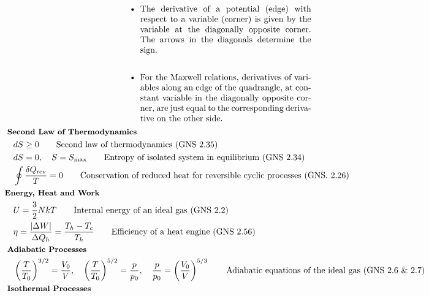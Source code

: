 \documentclass[10pt]{article}
\newcommand{\lrp}[1]{\left( #1 \right)}
\newlength{\du}
\begin{document}
\begin{multicols}{2}
\begin{align*}
		&\begin{minipage}{0.3 \columnwidth}
			
		\end{minipage}
		\begin{minipage}{0.65 \columnwidth}
			\begin{itemize}
				\item The derivative of a potential (edge) with respect to a variable (corner) is given by the variable at the diagonally opposite corner. The arrows in the diagonals determine the sign. \\
				\item For the Maxwell relations, derivatives of variables along an edge of the quadrangle, at constant variable in the diagonally opposite corner, are just equal to the corresponding derivative on the other side.
			\end{itemize}
		\end{minipage}
	\end{align*}	
	\setlength{\abovedisplayskip}{-25pt}
	\setlength{\belowdisplayskip}{-10pt}
	\setlength{\abovedisplayshortskip}{0pt}
	\setlength{\belowdisplayshortskip}{0pt}
	\begin{align*} 
	& \small \hspace{-7pt} \textbf{Second Law of Thermodynamics} \small \\
		& dS \geq 0	\tag*{Second law of thermodynamics (GNS 2.35)} \\
		& dS = 0, \quad S = S_{\text{max}}	\tag*{Entropy of isolated system in equilibrium (GNS 2.34)} \\
		& \oint \frac{\delta Q_{\text{rev}}}{T} = 0		\tag*{Conservation of reduced heat for reversible cyclic processes (GNS. 2.26)} \\
	& \small \hspace{-10pt} \textbf{Energy, Heat and Work} \small \\
		& U = \frac{3}{2} N k T	\tag*{Internal energy of an ideal gas (GNS 2.2)} \\
		& \eta = \frac{|\Delta W|}{\Delta Q_h} = \frac{T_h-T_c}{T_h}	\tag*{Efficiency of a heat engine (GNS 2.56)} \\
	& \small \hspace{-7pt} \textbf{Adiabatic Processes} \small \\
		& \lrp{\frac{T}{T_0}}^{3/2} = \frac{V_0}{V}, \quad \lrp{\frac{T}{T_0}}^{5/2} = \frac{p}{p_0}, \quad \frac{p}{p_0} = \lrp{\frac{V_0}{V}}^{5/3} \tag*{Adiabatic equations of the ideal gas (GNS 2.6 \& 2.7)} \\
	& \small \hspace{-7pt} \textbf{Isothermal Processes} \small \\

\end{align*}
\end{multicols}
\end{document}
